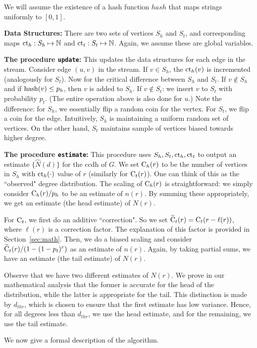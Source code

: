 \documentclass[11pt]{article}
\theoremstyle{definition}
\newcommand{\NN}{\mathbb{N}}
\newcommand{\hash}{\hbox{hash}}
\newcommand{\C}{\hbox{C}}
\newcommand{\tC}{\widetilde{\hbox{C}}}
\newcommand{\ct}{\hbox{ct}}
\newcommand{\hN}{\widehat{N}}
\newcommand{\update}{{\tt update}}
\newcommand{\est}{{\tt estimate}}
\begin{document}
We will assume the existence of a hash function $hash$ that maps strings
uniformly to $[0,1]$.

{\bf Data Structures:} There are two sets of vertices $S_h$ and $S_t$,
and corresponding maps $\ct_h:S_h \mapsto \NN$ and $\ct_t:S_t \mapsto \NN$.
Again, we assume these are global variables.

{\bf The procedure \update:} This updates the data structures for each edge in the stream.
Consider edge $(u,v)$ in the stream.
If $v \in S_h$, the $\ct_h(v)$ is incremented (analogously for $S_t$). Now for the critical
difference between $S_h$ and $S_t$. If $v \notin S_h$ and if $\hash(v) \leq p_h$,
then $v$ is added to $S_h$. If $v \notin S_t$: we insert $v$ to $S_t$ with probability $p_t$.
(The entire operation above is also done for $u$.)
Note the difference: for $S_h$, we essentially flip a random coin for the vertex. For $S_t$, we flip a coin for the edge.
Intuitively, $S_h$ is maintaining a uniform random set of vertices. On the other hand,
$S_t$ maintains sample of vertices biased towards higher degree.

{\bf The procedure \est:} This procedure uses $S_h, S_t, \ct_h, \ct_t$ to output
an estimate $\{\hN(d)\}$ for the ccdh of $G$. We set $\C_h(r)$ to be the number
of vertices in $S_h$ with $\ct_h(\cdot)$ value of $r$ (similarly for $\C_t(r)$).
One can think of this as the ``observed" degree distribution. The scaling of
$\C_h(r)$ is straightforward: we simply consider $\C_h(r)/p_h$ to be an estimate
of $n(r)$.  By summing these appropriately, we get an estimate (the head
estimate) of $N(r)$.


For $\C_t$, we first do an additive ``correction". So we set $\tC_t(r) = \C_t(r - \ell(r))$,
where $\ell(r)$ is a correction factor. The explanation of this factor is
provided in Section~\ref{sec:math}.
Then, we do a biased scaling and consider $\tC_t(r)/(1-(1-p_t)^r)$ as an estimate of $n(r)$.
Again, by taking partial sums, we have an estimate (the tail estimate) of $N(r)$.

Observe that we have two different estimates of $N(r)$. We prove in our mathematical analysis
that the former is accurate for the head of the distribution, while the latter is appropriate
for the tail. This distinction is made by $d_{thr}$, which is chosen to ensure
that the first estimate has low variance. Hence, for all degrees less than $d_{thr}$, we
use the head estimate, and for the remaining, we use the tail estimate.

\medskip
We now give a formal description of the algorithm.
\end{document}
